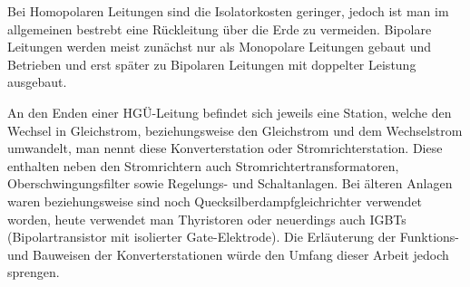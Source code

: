 Bei Homopolaren Leitungen sind die Isolatorkosten geringer, jedoch ist man im allgemeinen bestrebt eine Rückleitung über die Erde zu vermeiden. Bipolare Leitungen werden meist zunächst nur als Monopolare Leitungen gebaut und Betrieben und erst später zu Bipolaren Leitungen mit doppelter Leistung ausgebaut.\cite{Padiyar}

An den Enden einer HGÜ-Leitung befindet sich jeweils eine Station, welche den Wechsel in Gleichstrom, beziehungsweise den Gleichstrom und dem Wechselstrom umwandelt, man nennt diese Konverterstation oder Stromrichterstation. Diese enthalten neben den Stromrichtern auch Stromrichtertransformatoren, Oberschwingungsfilter sowie Regelungs- und Schaltanlagen. Bei älteren Anlagen waren beziehungsweise sind noch Quecksilberdampfgleichrichter verwendet worden, heute verwendet man Thyristoren oder neuerdings auch IGBTs (Bipolartransistor mit isolierter Gate-Elektrode). Die Erläuterung der Funktions- und Bauweisen der Konverterstationen würde den Umfang dieser Arbeit jedoch sprengen.


